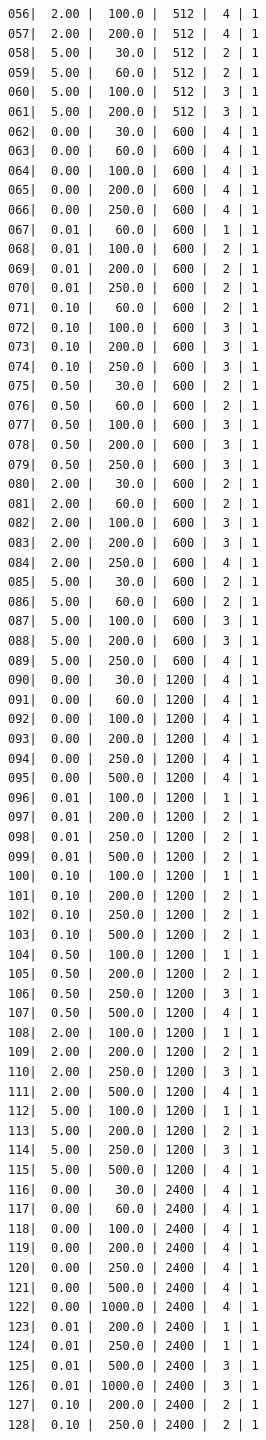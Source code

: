 \documentclass[letterpaper, oneside, 12pt]{article}
\begin{document}
\begin{verbatim}
056|  2.00 |  100.0 |  512 |  4 | 1
057|  2.00 |  200.0 |  512 |  4 | 1
058|  5.00 |   30.0 |  512 |  2 | 1
059|  5.00 |   60.0 |  512 |  2 | 1
060|  5.00 |  100.0 |  512 |  3 | 1
061|  5.00 |  200.0 |  512 |  3 | 1
062|  0.00 |   30.0 |  600 |  4 | 1
063|  0.00 |   60.0 |  600 |  4 | 1
064|  0.00 |  100.0 |  600 |  4 | 1
065|  0.00 |  200.0 |  600 |  4 | 1
066|  0.00 |  250.0 |  600 |  4 | 1
067|  0.01 |   60.0 |  600 |  1 | 1
068|  0.01 |  100.0 |  600 |  2 | 1
069|  0.01 |  200.0 |  600 |  2 | 1
070|  0.01 |  250.0 |  600 |  2 | 1
071|  0.10 |   60.0 |  600 |  2 | 1
072|  0.10 |  100.0 |  600 |  3 | 1
073|  0.10 |  200.0 |  600 |  3 | 1
074|  0.10 |  250.0 |  600 |  3 | 1
075|  0.50 |   30.0 |  600 |  2 | 1
076|  0.50 |   60.0 |  600 |  2 | 1
077|  0.50 |  100.0 |  600 |  3 | 1
078|  0.50 |  200.0 |  600 |  3 | 1
079|  0.50 |  250.0 |  600 |  3 | 1
080|  2.00 |   30.0 |  600 |  2 | 1
081|  2.00 |   60.0 |  600 |  2 | 1
082|  2.00 |  100.0 |  600 |  3 | 1
083|  2.00 |  200.0 |  600 |  3 | 1
084|  2.00 |  250.0 |  600 |  4 | 1
085|  5.00 |   30.0 |  600 |  2 | 1
086|  5.00 |   60.0 |  600 |  2 | 1
087|  5.00 |  100.0 |  600 |  3 | 1
088|  5.00 |  200.0 |  600 |  3 | 1
089|  5.00 |  250.0 |  600 |  4 | 1
090|  0.00 |   30.0 | 1200 |  4 | 1
091|  0.00 |   60.0 | 1200 |  4 | 1
092|  0.00 |  100.0 | 1200 |  4 | 1
093|  0.00 |  200.0 | 1200 |  4 | 1
094|  0.00 |  250.0 | 1200 |  4 | 1
095|  0.00 |  500.0 | 1200 |  4 | 1
096|  0.01 |  100.0 | 1200 |  1 | 1
097|  0.01 |  200.0 | 1200 |  2 | 1
098|  0.01 |  250.0 | 1200 |  2 | 1
099|  0.01 |  500.0 | 1200 |  2 | 1
100|  0.10 |  100.0 | 1200 |  1 | 1
101|  0.10 |  200.0 | 1200 |  2 | 1
102|  0.10 |  250.0 | 1200 |  2 | 1
103|  0.10 |  500.0 | 1200 |  2 | 1
104|  0.50 |  100.0 | 1200 |  1 | 1
105|  0.50 |  200.0 | 1200 |  2 | 1
106|  0.50 |  250.0 | 1200 |  3 | 1
107|  0.50 |  500.0 | 1200 |  4 | 1
108|  2.00 |  100.0 | 1200 |  1 | 1
109|  2.00 |  200.0 | 1200 |  2 | 1
110|  2.00 |  250.0 | 1200 |  3 | 1
111|  2.00 |  500.0 | 1200 |  4 | 1
112|  5.00 |  100.0 | 1200 |  1 | 1
113|  5.00 |  200.0 | 1200 |  2 | 1
114|  5.00 |  250.0 | 1200 |  3 | 1
115|  5.00 |  500.0 | 1200 |  4 | 1
116|  0.00 |   30.0 | 2400 |  4 | 1
117|  0.00 |   60.0 | 2400 |  4 | 1
118|  0.00 |  100.0 | 2400 |  4 | 1
119|  0.00 |  200.0 | 2400 |  4 | 1
120|  0.00 |  250.0 | 2400 |  4 | 1
121|  0.00 |  500.0 | 2400 |  4 | 1
122|  0.00 | 1000.0 | 2400 |  4 | 1
123|  0.01 |  200.0 | 2400 |  1 | 1
124|  0.01 |  250.0 | 2400 |  1 | 1
125|  0.01 |  500.0 | 2400 |  3 | 1
126|  0.01 | 1000.0 | 2400 |  3 | 1
127|  0.10 |  200.0 | 2400 |  2 | 1
128|  0.10 |  250.0 | 2400 |  2 | 1

\end{verbatim}
\end{document}
